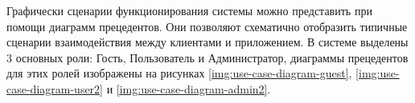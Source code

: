 Графически сценарии функционирования системы можно представить при помощи диаграмм прецедентов.
Они позволяют схематично отобразить типичные сценарии взаимодействия между клиентами и приложением.
В системе выделены 3 основных роли: Гость, Пользователь и Администратор, диаграммы прецедентов для этих ролей изображены на рисунках \ref{img:use-case-diagram-guest}, \ref{img:use-case-diagram-user2} и \ref{img:use-case-diagram-admin2}.




